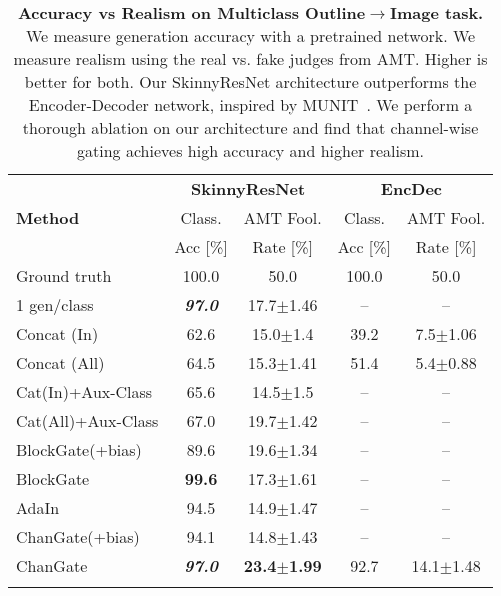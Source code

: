 
\begin{table}[]
	\centering
	\resizebox{1.\linewidth}{!} {
		\setlength{\tabcolsep}{6pt}
		\begin{tabular}{l c c c c}
			\toprule
			\multirow{3}{*}{\textbf{Method}} & \multicolumn{2}{c}{ {\bf SkinnyResNet}} & \multicolumn{2}{c}{ {\bf EncDec}} \\ \cmidrule(l){2-3} \cmidrule(l){4-5}
			& Class. & AMT Fool. & Class. & AMT Fool. \\
			& Acc [\%] & Rate [\%] & Acc [\%] & Rate [\%] \\ \midrule
			Ground truth & 100.0 & 50.0 & 100.0 & 50.0 \\ \midrule
			1 gen/class & \textbf{\textit{97.0}} & 17.7$\pm$1.46 & -- & -- \\ \midrule
			Concat (In)	& 62.6 & 15.0$\pm$1.4 & 39.2 & 7.5$\pm$1.06 \\ 
			Concat (All) & 64.5 & 15.3$\pm$1.41 & 51.4 & 5.4$\pm$0.88 \\ \midrule
			Cat(In)+Aux-Class & 65.6 & 14.5$\pm$1.5 & -- & -- \\ 
			Cat(All)+Aux-Class & 67.0 & 19.7$\pm$1.42 & -- & --\\ \midrule
			BlockGate(+bias) & 89.6 & 19.6$\pm$1.34 & -- & --\\ 
			BlockGate & {\bf 99.6} & 17.3$\pm$1.61 & -- & --\\ 
			AdaIn & 94.5 & 14.9$\pm$1.47 & -- & --\\ 
			ChanGate(+bias) & 94.1 & 14.8$\pm$1.43 & -- & --\\ 
			ChanGate & \textbf{\textit{97.0}} & {\bf 23.4$\pm$1.99} & 92.7 & 14.1$\pm$1.48 \\ 
			\hline
			\vspace{-5mm}
			\caption{\small {\bf Accuracy vs Realism on Multiclass Outline$\rightarrow$Image task.} We measure generation accuracy with a pretrained network. We measure realism using the real vs. fake judges from AMT. Higher is better for both. Our SkinnyResNet architecture outperforms the Encoder-Decoder network, inspired by MUNIT~\cite{huang2018multimodal}. We perform a thorough ablation on our architecture and find that channel-wise gating achieves high accuracy and higher realism.
				\vspace{-5mm}
			}\label{fig:acc_vs_real}
		\end{tabular} 
	}
\end{table}


